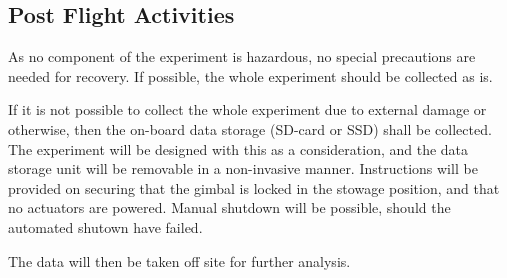 \subsection{Post Flight Activities}
As no component of the experiment is hazardous, no special precautions are needed for recovery. If possible, the whole experiment should be collected as is.

If it is not possible to collect the whole experiment due to external damage or otherwise, then the on-board data storage (SD-card or SSD) shall be collected. The experiment will be designed with this as a consideration, and the data storage unit will be removable in a non-invasive manner. Instructions will be provided on securing that the gimbal is locked in the stowage position, and that no actuators are powered. Manual shutdown will be possible, should the automated shutown have failed.

The data will then be taken off site for further analysis. 





